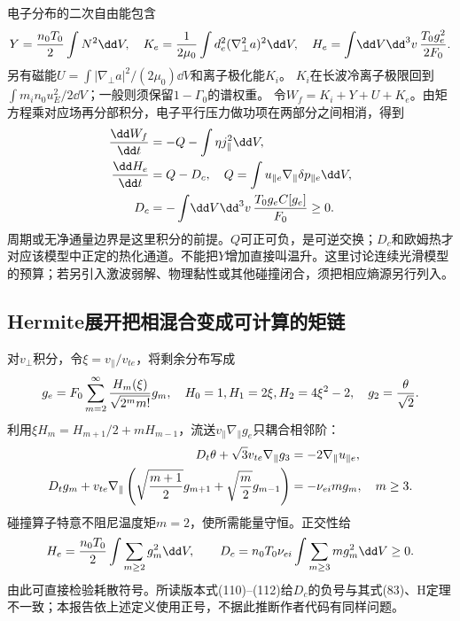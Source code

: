 电子分布的二次自由能包含
\begin{equation}
 Y={n_0T_0\over2}\int N^2\dd V,\quad
 K_e={1\over2\mu_0}\int d_e^2(\nabla_\perp^2a)^2\dd V,\quad
 H_e=\int\!\dd V\dd^3v\,{T_0g_e^2\over2F_0}.
\end{equation}
另有磁能$U=\int|\nabla_\perp a|^2/(2\mu_0)\dd V$和离子极化能$K_i$。
$K_i$在长波冷离子极限回到$\int m_in_0u_E^2/2\dd V$；一般则须保留$1-\Gamma_0$的谱权重。
令$W_f=K_i+Y+U+K_e$。由矩方程乘对应场再分部积分，电子平行压力做功项在两部分之间相消，得到
\begin{align}
 {\dd W_f\over\dd t}&=-Q-\int\eta j_\parallel^2\dd V,\\
 {\dd H_e\over\dd t}&=Q-D_c,\quad
 Q=\int u_{\parallel e}\nabla_\parallel\delta p_{\parallel e}\dd V,\\
 D_c&=-\int\!\dd V\dd^3v\,{T_0g_eC[g_e]\over F_0}\ge0.
 \label{eq:selected-heating}
\end{align}
周期或无净通量边界是这里积分的前提。$Q$可正可负，是可逆交换；$D_c$和欧姆热才对应该模型中正定的热化通道。不能把$Y$增加直接叫温升。这里讨论连续光滑模型的预算；若另引入激波弱解、物理黏性或其他碰撞闭合，须把相应熵源另行列入。

\subsection{Hermite展开把相混合变成可计算的矩链}
对$v_\perp$积分，令$\xi=v_\parallel/v_{te}$，将剩余分布写成
\begin{equation}
 g_e=F_0\sum_{m=2}^{\infty}{H_m(\xi)\over\sqrt{2^m m!}}g_m,
 \quad H_0=1, H_1=2\xi, H_2=4\xi^2-2,\quad g_2={\theta\over\sqrt2}.
\end{equation}
利用$\xi H_m=H_{m+1}/2+mH_{m-1}$，流送$v_\parallel\nabla_\parallel g_e$只耦合相邻阶：
\begin{align}
 D_t\theta+\sqrt3v_{te}\nabla_\parallel g_3&=-2\nabla_\parallel u_{\parallel e},\\
 D_tg_m+v_{te}\nabla_\parallel\left(\sqrt{{m+1\over2}}g_{m+1}
 +\sqrt{{m\over2}}g_{m-1}\right)&=-\nu_{ei}m g_m,\quad m\ge3.
\end{align}
碰撞算子特意不阻尼温度矩$m=2$，使所需能量守恒。正交性给
\begin{equation}
 H_e={n_0T_0\over2}\int\sum_{m\ge2}g_m^2\dd V,\qquad
 D_c=n_0T_0\nu_{ei}\int\sum_{m\ge3}m g_m^2\dd V\ge0.
\end{equation}
由此可直接检验耗散符号。所读版本式(110)--(112)给$D_c$的负号与其式(83)、H定理不一致；本报告依上述定义使用正号，不据此推断作者代码有同样问题。


